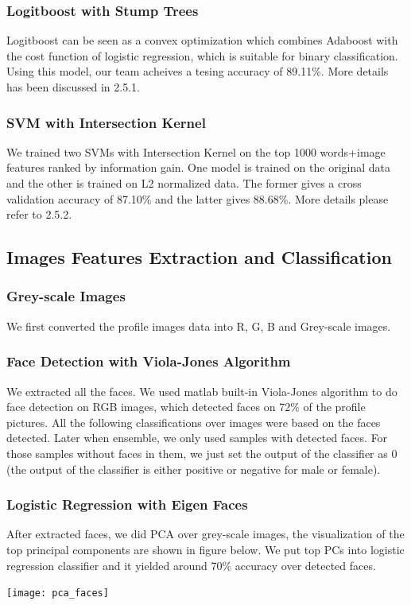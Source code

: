 \subsubsection{Logitboost with Stump Trees}
Logitboost can be seen as a convex optimization which combines Adaboost with the cost function of logistic regression, which is suitable for binary classification. Using this model, our team acheives a tesing accuracy of 89.11\%. More details has been discussed in 2.5.1.
\subsubsection{SVM with Intersection Kernel}
We trained two SVMs with Intersection Kernel on the top 1000 words+image features ranked by information gain. One model is trained on the original data and the other is trained on L2 normalized data. The former gives a cross validation accuracy of 87.10\% and the latter gives 88.68\%. More details please refer to 2.5.2.\\
\subsection{Images Features Extraction and Classification}
\subsubsection{Grey-scale Images}
We first converted the profile images data into R, G, B and Grey-scale images. 
\subsubsection{Face Detection with Viola-Jones Algorithm}
We extracted all the faces. We used matlab built-in Viola-Jones algorithm to do face detection on RGB images, which detected faces on 72\% of the profile pictures. All the following classifications over images were based on the faces detected. Later when ensemble, we only used samples with detected faces. For those samples without faces in them, we just set the output of the classifier as 0 (the output of the classifier is either positive or negative for male or female).
\subsubsection{Logistic Regression with Eigen Faces}
After extracted faces, we did PCA over grey-scale images, the visualization of the top principal components are shown in figure below. We put top PCs into logistic regression classifier and it yielded around 70\% accuracy over detected faces. \\
\begin{center}
\texttt{[image: pca\_faces]}
\end{center}
